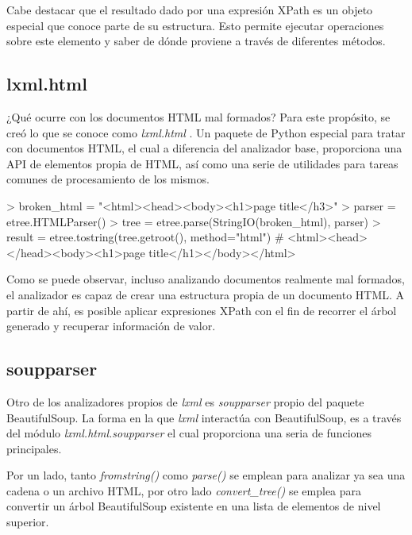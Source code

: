 Cabe destacar que el resultado dado por una expresión XPath es un objeto especial que conoce parte de su
estructura. Esto permite ejecutar operaciones sobre este elemento y saber de dónde proviene a través de
diferentes métodos.

\subsection{lxml.html}
\label{subsec:lxml.html}

¿Qué ocurre con los documentos HTML mal formados? Para este propósito, se creó lo que se conoce como
\emph{lxml.html} \cite{lxml}. Un paquete de Python especial para tratar con documentos HTML, el cual 
a diferencia del analizador base, proporciona una API de elementos propia de HTML, así como una serie de 
utilidades para tareas comunes de procesamiento de los mismos.

\begin{Schunk}
    \begin{Soutput}
        > broken_html = "<html><head><body><h1>page title</h3>"
        > parser = etree.HTMLParser()
        > tree   = etree.parse(StringIO(broken_html), parser)
        > result = etree.tostring(tree.getroot(), method="html")
        # <html><head></head><body><h1>page title</h1></body></html>
    \end{Soutput}
\end{Schunk}

Como se puede observar, incluso analizando documentos realmente mal formados, el analizador es capaz de
crear una estructura propia de un documento HTML. A partir de ahí, es posible aplicar expresiones XPath con
el fin de recorrer el árbol generado y recuperar información de valor.

\subsection{soupparser}
\label{subsec:soupparser}

Otro de los analizadores propios de \emph{lxml} es \emph{soupparser} \cite{lxml} propio del paquete
BeautifulSoup. La forma en la que \emph{lxml} interactúa con BeautifulSoup, es a través del módulo 
\emph{lxml.html.soupparser} el cual proporciona una seria de funciones principales. 

Por un lado, tanto \emph{fromstring()} como \emph{parse()} se emplean para analizar ya sea una cadena o un 
archivo HTML, por otro lado \emph{convert\_tree()} se emplea para convertir un árbol BeautifulSoup existente 
en una lista de elementos de nivel superior.

